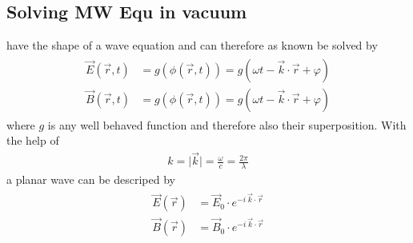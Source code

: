 \subsection{Solving MW Equ in vacuum}
% 
 have the shape of a wave equation and can therefore as known be solved by
% 
% 
\begin{align}
\begin{split} \label{eq::dgl_solution}
  \vec{E}( \vec{r}, t ) &= g(\phi( \vec{r}, t )) = g( \omega t - \vec{k} \cdot \vec{r} + \varphi)\\
  \vec{B}( \vec{r}, t ) &= g(\phi( \vec{r}, t )) = g( \omega t - \vec{k} \cdot \vec{r} + \varphi )
\end{split}
\end{align}
% 
where $g$ is any well behaved function and therefore also their superposition.
% 
With the help of
% 
\begin{align}
k = \mathopen| \vec{k} \mathclose| = \frac{\omega}{c} =  \frac{2 \pi}{\lambda}
\end{align}
% 
a planar wave can be descriped by
% 
\begin{align}
\begin{split} \label{eq::plane_wave}
\vec{E}(\vec{r}) &= \vec{E}_0 \cdot e^{ -i \, \vec{k} \cdot \vec{r} }\\
 \vec{B}(\vec{r}) &= \vec{B}_0 \cdot e^{ -i \, \vec{k} \cdot \vec{r} }
\end{split}
\end{align}
% 
% 
% 
